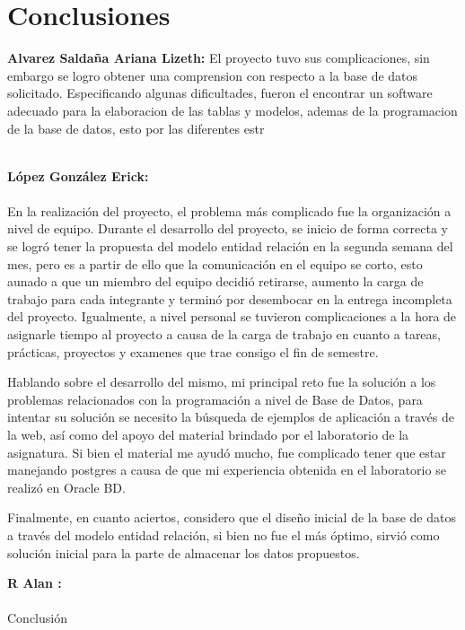 \documentclass[12pt, letterpaper]{article} %
\begin{document}
\section{Conclusiones}
\textbf{Alvarez Saldaña Ariana Lizeth:}
El proyecto tuvo sus complicaciones, sin embargo se logro obtener una comprension con respecto a la base de datos solicitado. Especificando algunas dificultades, fueron el encontrar un software adecuado para la elaboracion de las tablas y modelos, ademas de la programacion de la base de datos, esto por las diferentes estr\\ \\

\vspace{0.5cm}

\textbf{López González Erick:} \\ \\
En la realización del proyecto, el problema más complicado fue la organización a nivel de equipo. Durante el desarrollo del proyecto, se inicio de forma correcta y se logró tener la propuesta del modelo entidad relación en la segunda semana del mes, pero es a partir de ello que la comunicación en el equipo se corto, esto aunado a que un miembro del equipo decidió retirarse, aumento la carga de trabajo para cada integrante y terminó por desembocar en la entrega incompleta del proyecto. Igualmente, a nivel personal se tuvieron complicaciones a la hora de asignarle tiempo  al proyecto a causa de la carga de trabajo en cuanto a tareas, prácticas, proyectos y examenes que trae consigo el fin de semestre.

Hablando sobre el desarrollo del mismo, mi principal reto fue la solución a los problemas relacionados con la programación a nivel de Base de Datos, para intentar su solución se necesito la búsqueda de ejemplos de aplicación a través de la web, así como del apoyo del material brindado por el laboratorio de la asignatura. Si bien el material me ayudó mucho, fue complicado tener que estar manejando postgres a causa de que mi experiencia obtenida en el laboratorio se realizó en Oracle BD.

Finalmente, en cuanto aciertos, considero que el diseño inicial de la base de datos a través del modelo entidad relación, si bien no fue el más óptimo, sirvió como solución inicial para la parte de almacenar los datos propuestos.

\vspace{0.5cm}

\textbf{R Alan :}  \\ \\
Conclusión
\end{document}
